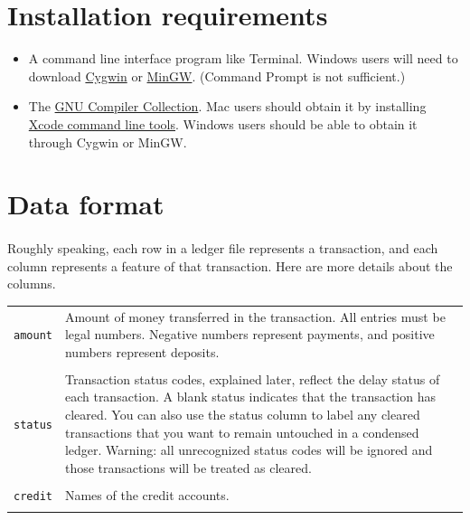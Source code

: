 \documentclass{article}
\begin{document}
\begin{flushleft}
\section{Installation requirements}

\begin{itemize}
\item A command line interface program like Terminal. Windows users will need to download \href{http://www.cygwin.org}{Cygwin} or \href{http://www.mingw.org/}{MinGW}. (Command Prompt is not sufficient.)
\item The \href{http://gcc.gnu.org/}{GNU Compiler Collection}. Mac users should obtain it by installing \href{http://railsapps.github.io/xcode-command-line-tools.html}{Xcode command line tools}. Windows users should be able to obtain it through Cygwin or MinGW.
\end{itemize}


\section{Data format}

\paragraph{} Roughly speaking, each row in a ledger file represents a transaction, and each column represents a feature of that transaction. Here are more details about the columns.

\begin{center}
\begin{tabular}{lp{11cm}}
 {\tt amount} & Amount of money transferred in the transaction. All entries must be legal numbers. Negative numbers represent payments, and positive numbers represent deposits. \\ \\

{\tt status} & Transaction status codes, explained later, reflect the delay status of each transaction. A blank status indicates that the transaction has cleared. You can also use the status column to label any cleared transactions that you want to remain untouched in a condensed ledger. Warning: all unrecognized status codes will be ignored and those transactions will be treated as cleared. \\ \\

{\tt credit} & Names of the credit accounts. \\ \\


\end{tabular}
\end{center}
\end{flushleft}
\end{document}
